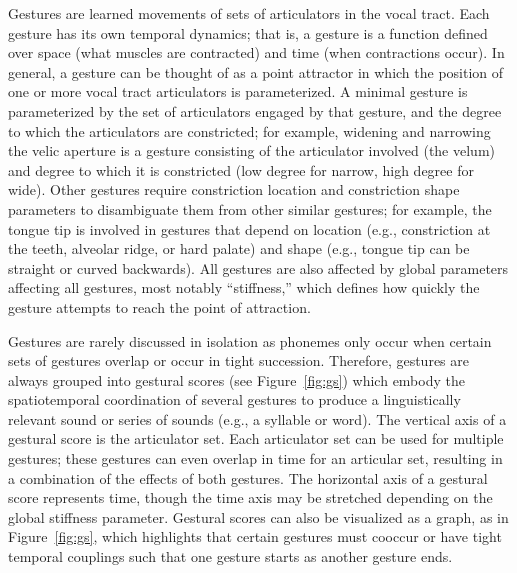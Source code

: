 Gestures are learned movements
of sets of articulators in the vocal tract.
Each gesture has its own temporal dynamics;
that is, a gesture is a function defined
over space (what muscles are contracted)
and time (when contractions occur).
In general, a gesture can be thought of
as a point attractor
in which the position
of one or more vocal tract
articulators is parameterized.
A minimal gesture is parameterized by
the set of articulators engaged
by that gesture,
and the degree to which
the articulators are constricted;
for example,
widening and narrowing the velic aperture
is a gesture consisting of
the articulator involved
(the velum)
and degree to which it is constricted
(low degree for narrow, high degree for wide).
Other gestures require constriction location
and constriction shape parameters
to disambiguate them from other similar gestures;
for example, the tongue tip
is involved in gestures
that depend on location
(e.g., constriction at
the teeth, alveolar ridge, or hard palate)
and shape
(e.g., tongue tip can be straight
or curved backwards).
All gestures are also affected by
global parameters affecting all gestures,
most notably ``stiffness,''
which defines how quickly
the gesture attempts to reach
the point of attraction.

Gestures are rarely discussed in isolation
as phonemes only occur when certain
sets of gestures overlap
or occur in tight succession.
Therefore, gestures are always
grouped into gestural scores
(see Figure~\ref{fig:gs})
which embody the spatiotemporal
coordination of several gestures
to produce a linguistically
relevant sound or series of sounds
(e.g., a syllable or word).
The vertical axis of a gestural score
is the articulator set.
Each articulator set
can be used for multiple gestures;
these gestures can even overlap in time
for an articular set,
resulting in a combination
of the effects of both gestures.
The horizontal axis of
a gestural score represents time,
though the time axis may be
stretched depending on
the global stiffness parameter.
Gestural scores can also
be visualized as a graph,
as in Figure~\ref{fig:gs},
which highlights that
certain gestures must cooccur
or have tight temporal couplings
such that one gesture
starts as another gesture ends.


